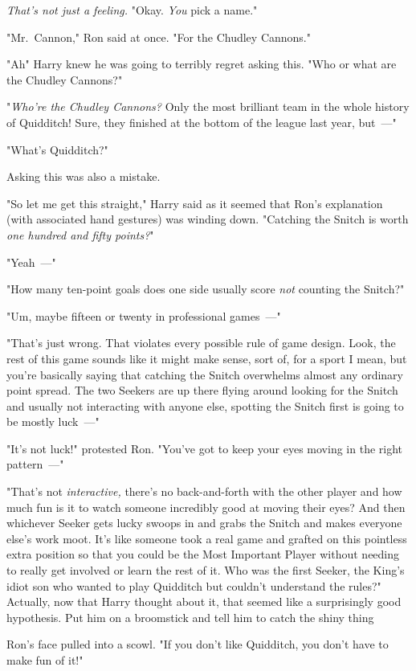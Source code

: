 \emph{That's not just a feeling.} "Okay. \emph{You} pick a name."

"Mr.~Cannon," Ron said at once. "For the Chudley Cannons."

"Ah{\el}" Harry knew he was going to terribly regret asking this. "Who or
what are the Chudley Cannons?"

"\emph{Who're the Chudley Cannons?} Only the most brilliant team in the whole
history of Quidditch! Sure, they finished at the bottom of the league last
year, but~---"

"What's Quidditch?"

Asking this was also a mistake.

"So let me get this straight," Harry said as it seemed that Ron's explanation
(with associated hand gestures) was winding down. "Catching the Snitch is worth
\emph{one hundred and fifty points?}"

"Yeah~---"

"How many ten-point goals does one side usually score \emph{not} counting the
Snitch?"

"Um, maybe fifteen or twenty in professional games~---"

"That's just wrong. That violates every possible rule of game design. Look, the
rest of this game sounds like it might make sense, sort of, for a sport I mean,
but you're basically saying that catching the Snitch overwhelms almost any
ordinary point spread. The two Seekers are up there flying around looking for
the Snitch and usually not interacting with anyone else, spotting the Snitch
first is going to be mostly luck~---"

"It's not luck!" protested Ron. "You've got to keep your eyes moving in the
right pattern~---"

"That's not \emph{interactive,} there's no back-and-forth with the other player
and how much fun is it to watch someone incredibly good at moving their eyes?
And then whichever Seeker gets lucky swoops in and grabs the Snitch and makes
everyone else's work moot. It's like someone took a real game and grafted on
this pointless extra position so that you could be the Most Important Player
without needing to really get involved or learn the rest of it. Who was the
first Seeker, the King's idiot son who wanted to play Quidditch but couldn't
understand the rules?" Actually, now that Harry thought about it, that seemed
like a surprisingly good hypothesis. Put him on a broomstick and tell him to
catch the shiny thing{\el}

Ron's face pulled into a scowl. "If you don't like Quidditch, you don't have to
make fun of it!"

